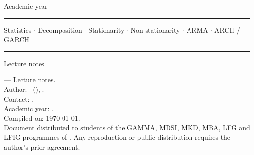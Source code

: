 \documentclass[a4paper,11pt,oneside]{book}
\title{\moduleNom}
\author{\auteurNom}
\date{\anneeUniversitaire}
\begin{document}
\frontmatter
\pagestyle{empty}

\begin{titlepage}
\centering
\vspace*{1.5cm}
{\scshape\large \auteurInstitution \par}
\vspace{0.3cm}
{\large Academic year \anneeUniversitaire \par}
\vspace{2.0cm}

\rule{\textwidth}{1.2pt}\par
\vspace{0.5cm}
{\Huge\bfseries \moduleNom \par}
\vspace{0.4cm}
{\Large Statistics $\cdot$ Decomposition $\cdot$ Stationarity $\cdot$
        Non-stationarity $\cdot$ ARMA $\cdot$ ARCH / GARCH \par}
\vspace{0.5cm}
\rule{\textwidth}{1.2pt}\par

\vspace{2.0cm}
{\large Lecture notes \par}

\vfill
{\Large\bfseries \auteurNom \par}
\vspace{0.4cm}
{\large \auteurRole \par}
\vspace{0.3cm}
{\large \href{mailto:\auteurEmail}{\auteurEmail} \par}

\vspace{1.0cm}
\end{titlepage}

\thispagestyle{empty}
\vspace*{\fill}
\noindent\small
\textbf{\moduleNom} --- Lecture notes.\\[2pt]
Author: \auteurNom\ (\auteurRole), \auteurInstitution.\\[2pt]
Contact: \href{mailto:\auteurEmail}{\auteurEmail}.\\[2pt]
Academic year: \anneeUniversitaire.\\[6pt]
Compiled on: \today.\\[6pt]
Document distributed to students of the GAMMA, MDSI, MKD, MBA, LFG
and LFIG programmes of \auteurInstitution. Any reproduction or
public distribution requires the author's prior agreement.
\vspace*{1cm}
\newpage
\end{document}
